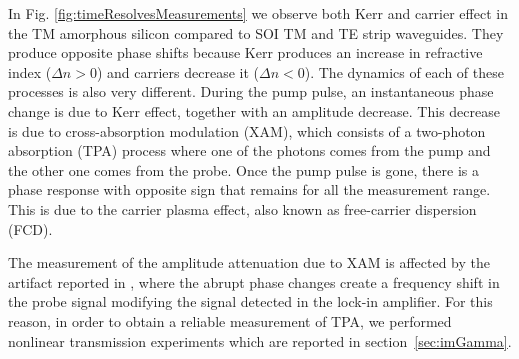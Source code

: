 \documentclass[10pt,letterpaper]{article}
\begin{document}
In Fig. \ref{fig:timeResolvesMeasurements} we observe both Kerr and carrier effect in the TM amorphous silicon compared to SOI TM and TE strip waveguides. They produce opposite phase shifts because Kerr produces an increase in refractive index ($ \Delta n > 0 $) and carriers decrease it ($ \Delta n < 0 $).  The dynamics of each of these processes is also very different. During the pump pulse, an instantaneous phase change is due to Kerr effect, together with an amplitude decrease. This decrease is due to cross-absorption modulation (XAM), which consists of a two-photon absorption (TPA) process where one of the photons comes from the pump and the other one comes from the probe. Once the pump pulse is gone, there is a phase response with opposite sign that remains for all the measurement range. This is due to the carrier plasma effect, also known as free-carrier dispersion (FCD). 



The measurement of the amplitude attenuation due to XAM is affected by the artifact reported in \cite{Vallaitis2009}, where the abrupt phase changes create a frequency shift in the probe signal modifying the signal detected in the lock-in amplifier. For this reason, in order to obtain a reliable measurement of TPA, we performed nonlinear transmission experiments which are reported in section~\ref{sec:imGamma}.


\end{document}
